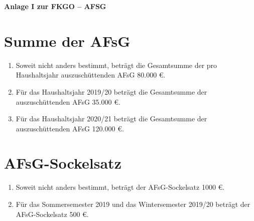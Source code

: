 \documentclass{article}
\begin{document}
\begin{center}
    \huge \textbf{Anlage I zur FKGO -- AFSG}
\end{center}


\section{Summe der AFsG}
\begin{enumerate}[(1)]
    \item Soweit nicht anders bestimmt, beträgt die Gesamtsumme der pro Haushaltsjahr auszuschüttenden AFsG 80.000 €.
    \item Für das Haushaltsjahr 2019/20 beträgt die Gesamtsumme der auszuschüttenden AFsG 35.000 €.
    \item Für das Haushaltsjahr 2020/21 beträgt die Gesamtsumme der auszuschüttenden AFsG 120.000 €.
\end{enumerate}

\section{AFsG-Sockelsatz}
\begin{enumerate}[(1)]
	\item Soweit nicht anders bestimmt, beträgt der AFsG-Sockelsatz 1000 €.
    \item Für das Sommersemester 2019 und das Wintersemester 2019/20 beträgt der AFsG-Sockelsatz 500 €.
\end{enumerate}
\end{document}
